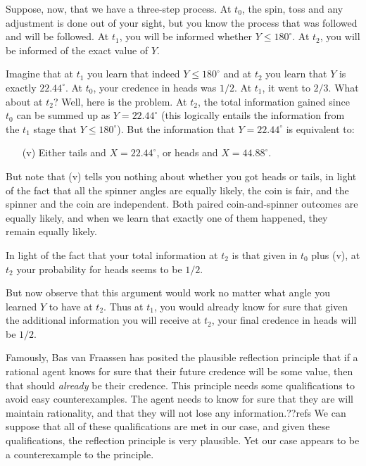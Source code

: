 Suppose, now, that we have a three-step process. At $t_0$, the spin, toss and any adjustment is done out of your sight, but you
know the process that was followed and will be followed. At $t_1$, you will be informed whether $Y \le 180^\circ$. At $t_2$, you will 
be informed of the exact value of $Y$.

Imagine that at $t_1$ you learn that indeed $Y \le 180^\circ$ and at $t_2$ you learn that $Y$ is exactly $22.44^\circ$. 
At $t_0$, your credence in heads was $1/2$. At $t_1$, it went to $2/3$. What about at $t_2$? Well, here is the problem.
At $t_2$, the total information gained since $t_0$ can be summed up as $Y=22.44^\circ$ (this logically entails the
information from the $t_1$ stage that $Y\le 180^\circ$). But the information that $Y=22.44^\circ$ is equivalent to:
\begin{enumerate} 
\item[(v)] Either tails and $X=22.44^\circ$, or heads and $X=44.88^\circ$.
\end{enumerate}
But note that (v) tells you nothing about whether you got heads or tails, in light of the fact that all the spinner angles are
equally likely, the coin is fair, and the spinner and the coin are independent. Both paired coin-and-spinner outcomes are equally
likely, and when we learn that exactly one of them happened, they remain equally likely.

In light of the fact that your total information at $t_2$ is that given in $t_0$ plus (v), at $t_2$ your
probability for heads seems to be $1/2$. 

But now observe that this argument would work no matter what angle you learned $Y$ to have at $t_2$. Thus at $t_1$, you would
already know for sure that given the additional information you will receive at $t_2$, your final credence in heads will be
$1/2$. 

Famously, Bas van Fraassen has posited the plausible reflection principle that if a rational agent knows for sure that their future credence
will be some value, then that should \textit{already} be their credence. This principle needs some qualifications to avoid
easy counterexamples. The agent needs to know for sure that they are will maintain rationality, and that they will 
not lose any information.??refs We can suppose that all of these qualifications are met in our case, and given these qualifications,
the reflection principle is very plausible. Yet our case appears to be a counterexample to the principle.

